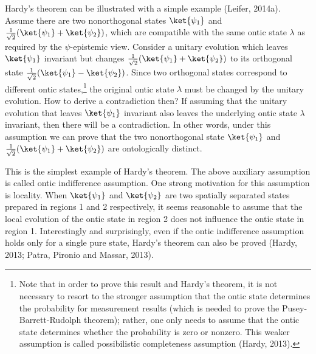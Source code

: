 Hardy's theorem  can be illustrated with a simple example (Leifer, 2014a). Assume there are two nonorthogonal states $\ket{\psi_1}$ and ${1 \over \sqrt{2}}(\ket{\psi_1}+\ket{\psi_2})$, which are compatible with the same ontic state $\lambda$ as required by the $\psi$-epistemic view. Consider a unitary evolution which leaves $\ket{\psi_1}$ invariant but changes ${1 \over \sqrt{2}}(\ket{\psi_1}+\ket{\psi_2})$ to its orthogonal state ${1 \over \sqrt{2}}(\ket{\psi_1}-\ket{\psi_2})$. Since two orthogonal states correspond to different ontic states,\footnote{Note that in order to prove this result and Hardy's theorem, it is not necessary to resort to the stronger assumption that the ontic state determines the probability for measurement results (which is needed to prove the Pusey-Barrett-Rudolph theorem); rather, one only needs to assume that the ontic state determines whether the probability is zero or nonzero. This weaker assumption is called possibilistic completeness assumption (Hardy, 2013).} the original ontic state $\lambda$ must be changed by the unitary evolution. How to derive a contradiction then? If assuming that the unitary evolution that leaves $\ket{\psi_1}$ invariant also leaves the underlying ontic state $\lambda$ invariant, then there will be a contradiction. In other words, under this assumption we can prove that the two nonorthogonal state $\ket{\psi_1}$ and ${1 \over \sqrt{2}}(\ket{\psi_1}+\ket{\psi_2})$ are ontologically distinct. 

This is the simplest example of Hardy's theorem. The above auxiliary assumption is called ontic indifference assumption. One strong motivation for this assumption is locality. When $\ket{\psi_1}$ and $\ket{\psi_2}$ are two spatially separated states prepared in regions 1 and 2 respectively, it seems reasonable to assume that the local evolution of the ontic state in region 2 does not influence the ontic state in region 1. Interestingly and surprisingly, even if the ontic indifference assumption holds only for a single pure state, Hardy's theorem can also be proved (Hardy, 2013; Patra, Pironio and Massar, 2013).




